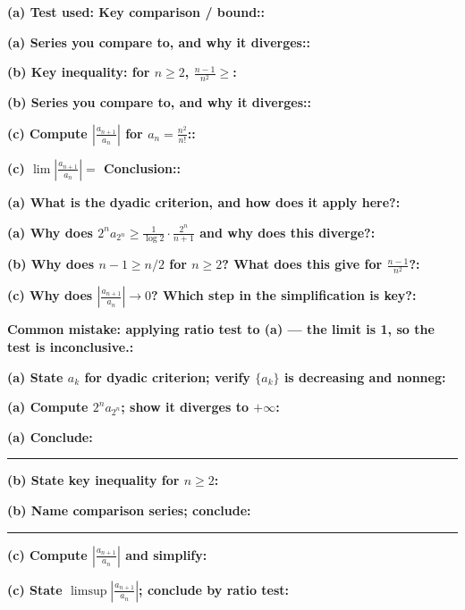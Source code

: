 \documentclass[12pt]{article}
\newcommand{\fillfield}[1]{%
  \par\noindent\textbf{#1:}\enspace\hrulefill\par\vspace{3pt}%
}
\newcommand{\writespace}[1]{\vspace{#1}}
\begin{document}
\bigskip

\begin{tcolorbox}[
  enhanced, breakable,
  colback  = pass2yellow,
  colframe = yellow!65!black,
  fonttitle = \bfseries,
  title = {Pass 2 \enspace\textbf{--}\enspace Proof Recipe Card}
]
\fillfield{(a) Test used: \enspace Key comparison / bound:}
\fillfield{(a) Series you compare to, and why it diverges:}
\fillfield{(b) Key inequality: for $n \geq 2$, $\frac{n-1}{n^2} \geq$}
\fillfield{(b) Series you compare to, and why it diverges:}
\fillfield{(c) Compute $\left|\frac{a_{n+1}}{a_n}\right|$ for $a_n = \frac{n^2}{n!}$:}
\fillfield{(c) $\lim\left|\frac{a_{n+1}}{a_n}\right| =$\hspace{1cm} Conclusion:}
\end{tcolorbox}

\bigskip

\begin{tcolorbox}[
  enhanced, breakable,
  colback  = pass3orange,
  colframe = orange!65!black,
  fonttitle = \bfseries,
  title = {Pass 3 \enspace\textbf{--}\enspace Self-Explanation}
]
\fillfield{(a) What is the dyadic criterion, and how does it apply here?}
\fillfield{(a) Why does $2^n a_{2^n} \geq \frac{1}{\log 2}\cdot\frac{2^n}{n+1}$ and why does this diverge?}
\fillfield{(b) Why does $n-1 \geq n/2$ for $n \geq 2$? What does this give for $\frac{n-1}{n^2}$?}
\fillfield{(c) Why does $\left|\frac{a_{n+1}}{a_n}\right| \to 0$? Which step in the simplification is key?}
\fillfield{Common mistake: applying ratio test to (a) — the limit is 1, so the test is inconclusive.}
\end{tcolorbox}

\newpage

\begin{tcolorbox}[
  enhanced, breakable,
  colback  = pass4purple,
  colframe = purple!55!black,
  fonttitle = \bfseries,
  title = {Pass 4 \enspace\textbf{--}\enspace Skeleton Proof}
]
\noindent\textbf{(a) State $a_k$ for dyadic criterion; verify $\{a_k\}$ is decreasing and nonneg:}\par
\writespace{1.2cm}
\noindent\textbf{(a) Compute $2^n a_{2^n}$; show it diverges to $+\infty$:}\par
\writespace{1.8cm}
\noindent\textbf{(a) Conclude:}\par
\writespace{0.8cm}

\noindent\rule{\linewidth}{0.4pt}\vspace{2pt}

\noindent\textbf{(b) State key inequality for $n \geq 2$:}\par
\writespace{1.2cm}
\noindent\textbf{(b) Name comparison series; conclude:}\par
\writespace{1.2cm}

\noindent\rule{\linewidth}{0.4pt}\vspace{2pt}

\noindent\textbf{(c) Compute $\left|\frac{a_{n+1}}{a_n}\right|$ and simplify:}\par
\writespace{1.4cm}
\noindent\textbf{(c) State $\limsup\left|\frac{a_{n+1}}{a_n}\right|$; conclude by ratio test:}\par
\writespace{1.0cm}
\end{tcolorbox}
\end{document}
